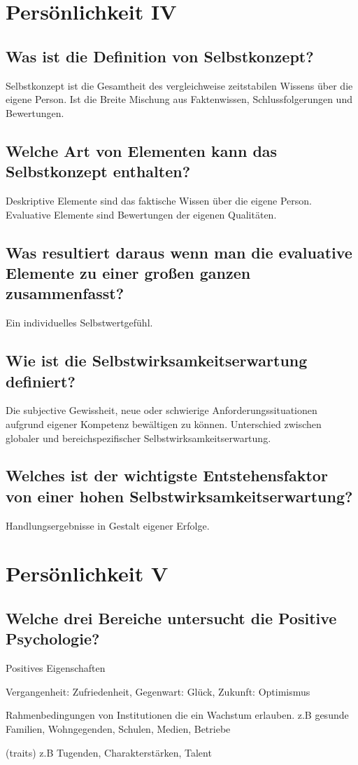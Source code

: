 \documentclass[a6paper,10pt,DIV=40]{scrartcl}
\begin{document}
\section{Persönlichkeit IV}
\subsection{Was ist die Definition von Selbstkonzept?}
Selbstkonzept ist die Gesamtheit des vergleichweise zeitstabilen Wissens über die eigene Person. Ist die Breite Mischung aus Faktenwissen, Schlussfolgerungen und Bewertungen.
\subsection{Welche Art von Elementen kann das Selbstkonzept enthalten?}
Deskriptive Elemente sind das faktische Wissen über die eigene Person.\\
Evaluative Elemente sind Bewertungen der eigenen Qualitäten.
\subsection{Was resultiert daraus wenn man die evaluative Elemente zu einer großen ganzen zusammenfasst?}
Ein individuelles Selbstwertgefühl.
\subsection{Wie ist die Selbstwirksamkeitserwartung definiert?}
Die subjective Gewissheit, neue oder schwierige Anforderungssituationen aufgrund eigener Kompetenz bewältigen zu können.
Unterschied zwischen globaler und bereichspezifischer Selbstwirksamkeitserwartung.
\subsection{Welches ist der wichtigste Entstehensfaktor von einer hohen Selbstwirksamkeitserwartung?}
Handlungsergebnisse in Gestalt eigener Erfolge.


\section{Persönlichkeit V}
\subsection{Welche drei Bereiche untersucht die Positive Psychologie?}
\begin{labeling}{Positives Eigenschaften}
\item [Positives Erleben] Vergangenheit: Zufriedenheit, Gegenwart: Glück, Zukunft: Optimismus
\item [Positive Institutionen] Rahmenbedingungen von Institutionen die ein Wachstum erlauben. z.B gesunde Familien, Wohngegenden, Schulen, Medien, Betriebe
\item [Positives Eigenschaften] (traits) z.B Tugenden, Charakterstärken, Talent
\end{labeling}
\end{document}
